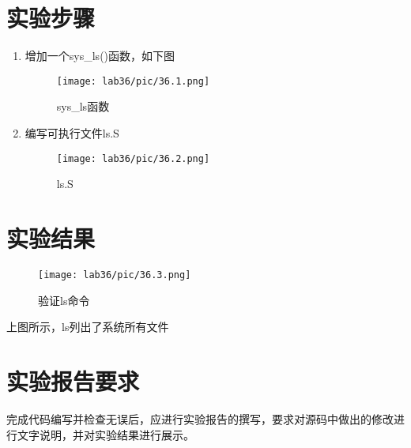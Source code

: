 \section{实验步骤}
\begin{enumerate}
    \item 增加一个sys\_ls()函数，如下图
        \begin{figure}[H] 
            \centering 
            \texttt{[image: lab36/pic/36.1.png]}
            \caption{sys\_ls函数} 
            \label{picture_name}
        \end{figure} 
	\item 编写可执行文件ls.S
        \begin{figure}[H] 
            \centering 
            \texttt{[image: lab36/pic/36.2.png]}
            \caption{ls.S} 
            \label{picture_name}
        \end{figure}    
\end{enumerate}


\section{实验结果}
\begin{figure}[H] 
	\centering 
	\texttt{[image: lab36/pic/36.3.png]}
	\caption{验证ls命令} 
	\label{picture_name}
\end{figure}
上图所示，ls列出了系统所有文件

\section{实验报告要求}
完成代码编写并检查无误后，应进行实验报告的撰写，要求对源码中做出的修改进行文字说明，并对实验结果进行展示。